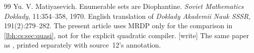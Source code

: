 \documentclass[11pt,letterpaper]{article}
\theoremstyle{definition}
\theoremstyle{remark}
\newcommand{\1}{\mathbf 1}
\newcommand{\wtag}{\textup{[write]}}%
\begin{document}
\begin{thebibliography}{99}
Yu. V. Matiyasevich.
Enumerable sets are Diophantine.
\emph{Soviet Mathematics Doklady}, 11:354--358, 1970.
English translation of \emph{Doklady Akademii Nauk SSSR}, 191(2):279--282.
The present article uses MRDP only for the comparison in
\cref{lbh:cs:sec:quasi}, not for the explicit quadratic compiler.
\wtag{} The same paper as \cite{matiyasevich1970}, printed separately with source~12's annotation.

\end{thebibliography}
\end{document}

